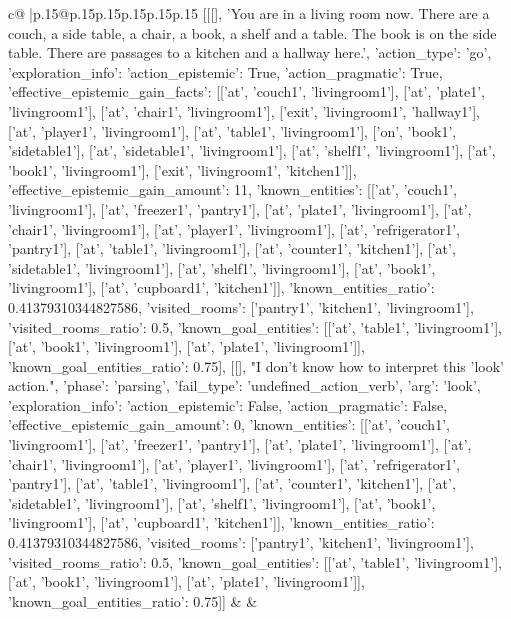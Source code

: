 \documentclass{article}
\begin{document}
{\begin{supertabular}{c@{$\;$}|p{.15\linewidth}@{}p{.15\linewidth}p{.15\linewidth}p{.15\linewidth}p{.15\linewidth}p{.15\linewidth}}
{{{	 [[[], 'You are in a living room now. There are a couch, a side table, a chair, a book, a shelf and a table. The book is on the side table. There are passages to a kitchen and a hallway here.', {'action_type': 'go', 'exploration_info': {'action_epistemic': True, 'action_pragmatic': True, 'effective_epistemic_gain_facts': [['at', 'couch1', 'livingroom1'], ['at', 'plate1', 'livingroom1'], ['at', 'chair1', 'livingroom1'], ['exit', 'livingroom1', 'hallway1'], ['at', 'player1', 'livingroom1'], ['at', 'table1', 'livingroom1'], ['on', 'book1', 'sidetable1'], ['at', 'sidetable1', 'livingroom1'], ['at', 'shelf1', 'livingroom1'], ['at', 'book1', 'livingroom1'], ['exit', 'livingroom1', 'kitchen1']], 'effective_epistemic_gain_amount': 11, 'known_entities': [['at', 'couch1', 'livingroom1'], ['at', 'freezer1', 'pantry1'], ['at', 'plate1', 'livingroom1'], ['at', 'chair1', 'livingroom1'], ['at', 'player1', 'livingroom1'], ['at', 'refrigerator1', 'pantry1'], ['at', 'table1', 'livingroom1'], ['at', 'counter1', 'kitchen1'], ['at', 'sidetable1', 'livingroom1'], ['at', 'shelf1', 'livingroom1'], ['at', 'book1', 'livingroom1'], ['at', 'cupboard1', 'kitchen1']], 'known_entities_ratio': 0.41379310344827586, 'visited_rooms': ['pantry1', 'kitchen1', 'livingroom1'], 'visited_rooms_ratio': 0.5, 'known_goal_entities': [['at', 'table1', 'livingroom1'], ['at', 'book1', 'livingroom1'], ['at', 'plate1', 'livingroom1']], 'known_goal_entities_ratio': 0.75}}], [[], "I don't know how to interpret this 'look' action.", {'phase': 'parsing', 'fail_type': 'undefined_action_verb', 'arg': 'look', 'exploration_info': {'action_epistemic': False, 'action_pragmatic': False, 'effective_epistemic_gain_amount': 0, 'known_entities': [['at', 'couch1', 'livingroom1'], ['at', 'freezer1', 'pantry1'], ['at', 'plate1', 'livingroom1'], ['at', 'chair1', 'livingroom1'], ['at', 'player1', 'livingroom1'], ['at', 'refrigerator1', 'pantry1'], ['at', 'table1', 'livingroom1'], ['at', 'counter1', 'kitchen1'], ['at', 'sidetable1', 'livingroom1'], ['at', 'shelf1', 'livingroom1'], ['at', 'book1', 'livingroom1'], ['at', 'cupboard1', 'kitchen1']], 'known_entities_ratio': 0.41379310344827586, 'visited_rooms': ['pantry1', 'kitchen1', 'livingroom1'], 'visited_rooms_ratio': 0.5, 'known_goal_entities': [['at', 'table1', 'livingroom1'], ['at', 'book1', 'livingroom1'], ['at', 'plate1', 'livingroom1']], 'known_goal_entities_ratio': 0.75}}]] 
	  } 
	   } 
	   } 
	 & & \\ 
 

    \theutterance {}  


\end{supertabular}}
\end{document}
